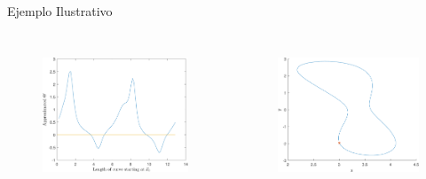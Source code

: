 \documentclass[fleqn]{beamer}\usepackage[]{graphicx}\usepackage[]{xcolor}
\begin{document}
\begin{frame}{Ejemplo Ilustrativo}
    \begin{columns}
        \begin{figure}
            \centering
            \includegraphics[width = \textwidth]{FINALIHOPE-cropped.pdf}
            \label{fig:my_label}
        \end{figure}
        \begin{figure}
            \centering
            \includegraphics[width = \textwidth]{Hourglass-cropped.pdf}
            \label{dual}
        \end{figure}
    \end{columns}
\end{frame}
\end{document}
